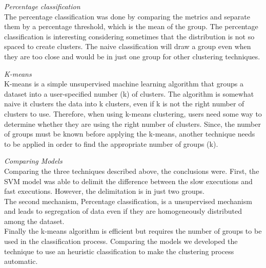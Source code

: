     
    

\textit{Percentage classification}\\
The percentage classification was done by comparing the metrics and separate them by a percentage threshold, which is the mean of the group. The percentage classification is interesting considering sometimes that the distribution is not so spaced to create clusters. The naive classification will draw a group even when they are too close and would be in just one group for other clustering techniques.
    
\textit{K-means}\\
K-means is a simple unsupervised machine learning algorithm that groups a dataset into a user-specified number (k) of clusters. The algorithm is somewhat naive it clusters the data into k clusters, even if k is not the right number of clusters to use. Therefore, when using k-means clustering, users need some way to determine whether they are using the right number of clusters.
Since, the number of groups must be known before applying the k-means, another technique needs to be applied in order to find the appropriate number of groups (k). 
    
    
\textit{Comparing Models}\\
Comparing the three techniques described above, the conclusions were. First, the SVM model was able to delimit the difference between the slow executions and fast executions. However, the delimitation is in just two groups. \\
The second mechanism, Percentage classification, is a unsupervised mechanism and leads to segregation of data even if they are homogeneously distributed among the dataset. \\
Finally the k-means algorithm is efficient but requires the number of groups to be used in the classification process. Comparing the models we developed the technique to use an heuristic classification to make the clustering process automatic.
    
